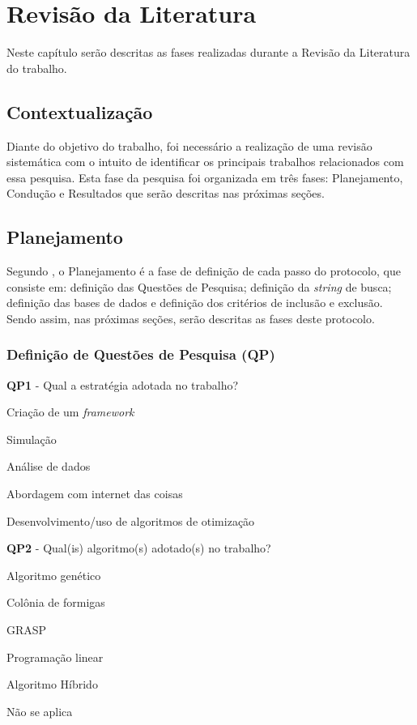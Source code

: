 \chapter{Revisão da Literatura}
\label{cap:trabalhos-relacionados}

Neste capítulo serão descritas as fases realizadas durante a Revisão da Literatura do
trabalho.

\section{Contextualização}
Diante do objetivo do trabalho, foi necessário a realização de uma revisão sistemática 
com o intuito de identificar os principais trabalhos relacionados com essa pesquisa. Esta fase 
da pesquisa foi organizada em três fases: Planejamento, Condução e Resultados que serão 
descritas nas próximas seções. 

\section{Planejamento}
Segundo , o Planejamento é a fase de definição de cada passo 
do protocolo, que consiste em: definição das Questões de Pesquisa; definição da \textit{string} de 
busca; definição das bases de dados e definição dos critérios de inclusão e exclusão. Sendo 
assim, nas próximas seções, serão descritas as fases deste protocolo.

\subsection{Definição de Questões de Pesquisa (\gls{QP})}

\textbf{\gls{QP}1} - Qual a estratégia adotada no trabalho? 
    \begin{alineascomponto}
        \item Criação de um \textit{framework}
        \item Simulação
        \item Análise de dados
        \item Abordagem com internet das coisas
        \item Desenvolvimento/uso de algoritmos de otimização
    \end{alineascomponto}
    
\textbf{\gls{QP}2} - Qual(is) algoritmo(s) adotado(s) no trabalho? 
    \begin{alineascomponto}
        \item Algoritmo genético
        \item Colônia de formigas
        \item GRASP
        \item Programação linear
        \item Algoritmo Híbrido
        \item Não se aplica
    \end{alineascomponto}

